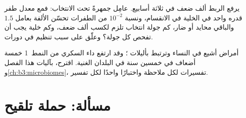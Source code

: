 \begin{exercise}[$\star\star\star$]\label{exo:b3:adaptive-immunity:11}
يرفع  الربط ألف ضعف في ثلاثة أسابيع. عامِل  جمهرةً تحت الانتخاب: فمع معدل طفر قدره واحد في
الخلية في الانقسام، ونسبة $10^{-2}$ من الطفرات تحسّن الألفة
بعامل $1.5$ والباقي محايد أو ضار، كم جولة انتخاب تلزم لكسب
ألف ضعف، وكم خلية يجب أن تفحص كل جولة؟ وعلّق على سبب تنظيم
 في دورات.
\end{exercise}

\begin{exercise}[$\star\star\star$]\label{exo:b3:adaptive-immunity:12}
أمراض  أشيع في النساء وترتبط بأليلات ؛ وقد
ارتفع داء السكري من النمط~1 خمسة أضعاف في خمسين سنة في
البلدان الغنية. اقترح، بآليات هذا الفصل
و\cref{ch:b3:microbiomes}، تفسيرات لكل ملاحظة واختبارًا
واحدًا لكل تفسير.
\end{exercise}

\section{مسألة: حملة تلقيح}

